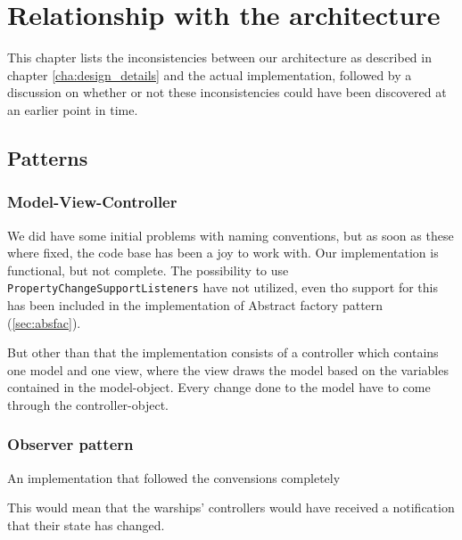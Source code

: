 \chapter{Relationship with the architecture}
\label{cha:relationship_with_the_architecture}

This chapter lists the inconsistencies between our architecture as described in chapter \ref{cha:design_details} and the actual implementation, followed by a discussion on whether or not these inconsistencies could have been discovered at an earlier point in time.



\section{Patterns}
\label{sec:patters}

\subsection{Model-View-Controller}
\label{sec:mvc}

We did have some initial problems with naming conventions, but as soon as these where fixed, the code base has been a joy to work with.
Our implementation is functional, but not complete. The possibility to use \texttt{PropertyChangeSupportListeners} have not utilized, even tho support for this has been included in the implementation of Abstract factory pattern (\ref{sec:absfac}).

But other than that the implementation consists of a controller which contains one model and one view, where the view draws the model based on the variables contained in the model-object. Every change done to the model have to come through the controller-object.


\subsection{Observer pattern}

An implementation that followed the convensions completely

This would mean that the warships' controllers would have received a notification that their state has changed.

